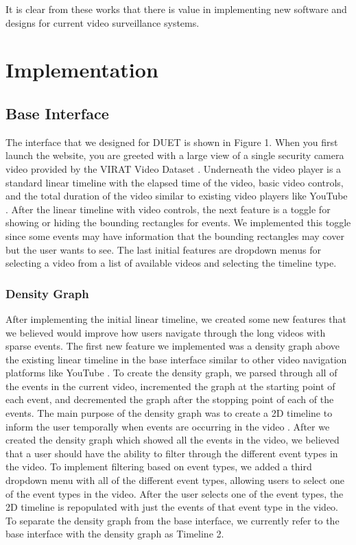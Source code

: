 \documentclass[doublespace,draft,nopageskip]{VTthesis} %
\begin{document}
It is clear from these works that there is value in implementing new software and designs for current video surveillance systems.

\chapter{Implementation} \label{ch:implementation}
\section{Base Interface} \label{se:base_interface}
The interface that we designed for DUET is shown in Figure 1. When you first launch the website, you are greeted with a large view of a single security camera video provided by the VIRAT Video Dataset \cite{VIRATVideoData}. Underneath the video player is a standard linear timeline with the elapsed time of the video, basic video controls, and the total duration of the video similar to existing video players like YouTube \cite{YouTube}. After the linear timeline with video controls, the next feature is a toggle for showing or hiding the bounding rectangles for events. We implemented this toggle since some events may have information that the bounding rectangles may cover but the user wants to see. The last initial features are dropdown menus for selecting a video from a list of available videos and selecting the timeline type. 

\subsection{Density Graph}
After implementing the initial linear timeline, we created some new features that we believed would improve how users navigate through the long videos with sparse events. The first new feature we implemented was a density graph above the existing linear timeline in the base interface similar to other video navigation platforms like YouTube \cite{YouTube, kimDatadrivenInteractionTechniques2014}. 
To create the density graph, we parsed through all of the events in the current video, incremented the graph at the starting point of each event, and decremented the graph after the stopping point of each of the events. The main purpose of the density graph was to create a 2D timeline to inform the user temporally when events are occurring in the video \cite{yanTwoDimensionalTimeline2004, brehmerTimelinesRevisitedDesign2017, nguyenSchemaLineTimelineVisualization2014}.
After we created the density graph which showed all the events in the video, we believed that a user should have the ability to filter through the different event types in the video. To implement filtering based on event types, we added a third dropdown menu with all of the different event types, allowing users to select one of the event types in the video. After the user selects one of the event types, the 2D timeline is repopulated with just the events of that event type in the video. To separate the density graph from the base interface, we currently refer to the base interface with the density graph as Timeline 2.
\end{document}

